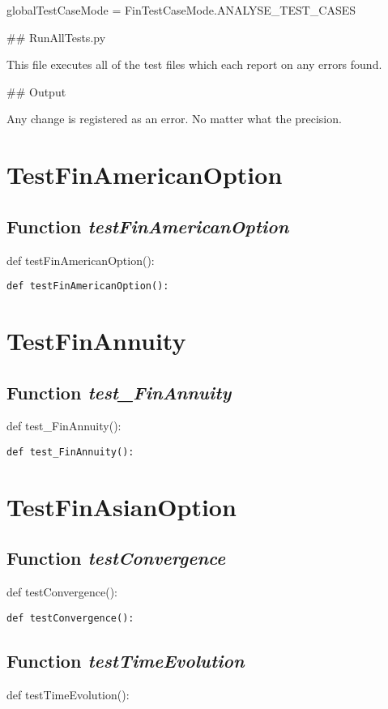 \documentclass[twoside,11pt]{book}
\begin{document}
globalTestCaseMode = FinTestCaseMode.ANALYSE_TEST_CASES

## RunAllTests.py

This file executes all of the test files which each report on any errors found.


## Output

Any change is registered as an error. No matter what the precision. 

\newpage
\section{TestFinAmericanOption}

\subsection{Function {\it testFinAmericanOption}}
def testFinAmericanOption():

\begin{lstlisting}
def testFinAmericanOption():
\end{lstlisting}


\newpage
\section{TestFinAnnuity}

\subsection{Function {\it test\_FinAnnuity}}
def test\_FinAnnuity():

\begin{lstlisting}
def test_FinAnnuity():
\end{lstlisting}


\newpage
\section{TestFinAsianOption}

\subsection{Function {\it testConvergence}}
def testConvergence():

\begin{lstlisting}
def testConvergence():
\end{lstlisting}

\subsection{Function {\it testTimeEvolution}}
def testTimeEvolution():
\end{document}
